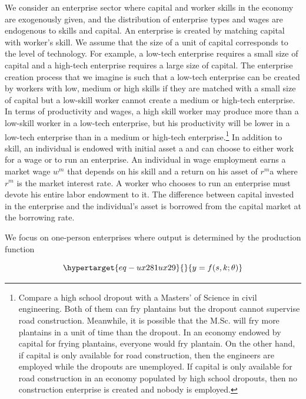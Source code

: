 \documentclass[
  a4paper,
  DIV=11,
  numbers=noendperiod]{scrartcl}
\begin{document}
We consider an enterprise sector where capital and worker skills in the
economy are exogenously given, and the distribution of enterprise types
and wages are endogenous to skills and capital. An enterprise is created
by matching capital with worker's skill. We assume that the size of a
unit of capital corresponds to the level of technology. For example, a
low-tech enterprise requires a small size of capital and a high-tech
enterprise requires a large size of capital. The enterprise creation
process that we imagine is such that a low-tech enterprise can be
created by workers with low, medium or high skills if they are matched
with a small size of capital but a low-skill worker cannot create a
medium or high-tech enterprise. In terms of productivity and wages, a
high skill worker may produce more than a low-skill worker in a low-tech
enterprise, but his productivity will be lower in a low-tech enterprise
than in a medium or high-tech enterprise.\footnote{Compare a high school
  dropout with a Masters' of Science in civil engineering. Both of them
  can fry plantains but the dropout cannot supervise road construction.
  Meanwhile, it is possible that the M.Sc. will fry more plantains in a
  unit of time than the dropout. In an economy endowed by capital for
  frying plantains, everyone would fry plantain. On the other hand, if
  capital is only available for road construction, then the engineers
  are employed while the dropouts are unemployed. If capital is only
  available for road construction in an economy populated by high school
  dropouts, then no construction enterprise is created and nobody is
  employed.} In addition to skill, an individual is endowed with initial
asset a and can choose to either work for a wage or to run an
enterprise. An individual in wage employment earns a market wage \(w^m\)
that depends on his skill and a return on his asset of \(r^m\)a where
\(r^m\) is the market interest rate. A worker who chooses to run an
enterprise must devote his entire labor endowment to it. The difference
between capital invested in the enterprise and the individual's asset is
borrowed from the capital market at the borrowing rate.

We focus on one-person enterprises where output is determined by the
production function

\begin{equation}\protect\hypertarget{eq-ux281ux29}{}{
y = f(s, k; \theta)
}\label{eq-(1)}\end{equation}
\end{document}
